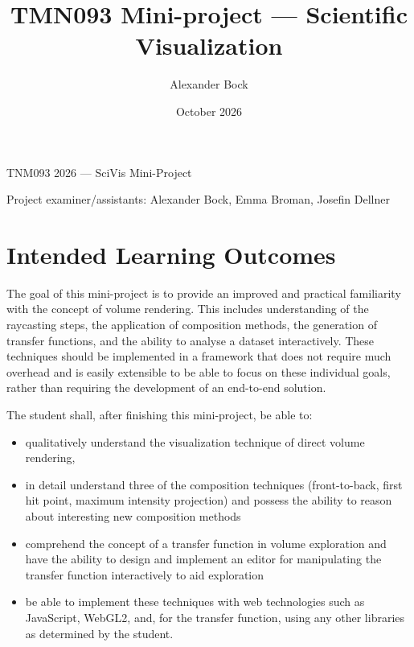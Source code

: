 \documentclass{labinstructions}
\begin{document}
\setcounter{page}{1}

\pagestyle{empty}


%
%
\begin{center}
{\Huge TNM093 2026 --- SciVis Mini-Project}
\vspace{0.6cm}

\Large{Project examiner/assistants: Alexander Bock, Emma Broman, Josefin Dellner}
\end{center}

\title{TMN093 Mini-project --- Scientific Visualization}
\author{Alexander Bock}
\date{October 2026}

\pagestyle{fancy}
\fancyfoot[c]{}
\fancyfoot[R]{\thepage}

\section{Intended Learning Outcomes}
The goal of this mini-project is to provide an improved and practical familiarity with the concept of volume rendering.  This includes understanding of the raycasting steps, the application of composition methods, the generation of transfer functions, and the ability to analyse a dataset interactively.  These techniques should be implemented in a framework that does not require much overhead and is easily extensible to be able to focus on these individual goals, rather than requiring the development of an end-to-end solution.

The student shall, after finishing this mini-project, be able to:
\begin{itemize}
  \item qualitatively understand the visualization technique of direct volume rendering,
  \item in detail understand three of the composition techniques (front-to-back, first hit point, maximum intensity projection) and possess the ability to reason about interesting new composition methods
  \item comprehend the concept of a transfer function in volume exploration and have the ability to design and implement an editor for manipulating the transfer function interactively to aid exploration
  \item be able to implement these techniques with web technologies such as JavaScript, WebGL2, and, for the transfer function, using any other libraries as determined by the student.
\end{itemize}{}
\end{document}
